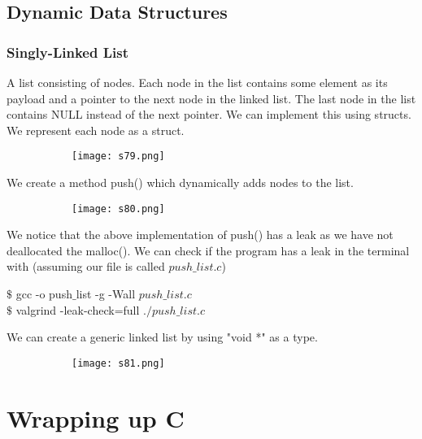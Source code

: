 \documentclass[8pt]{extreport}
\begin{document}
\section{Dynamic Data Structures}

\subsection{Singly-Linked List}

A list consisting of nodes. Each node in the list contains some element as its payload and a pointer to the next node in the linked list. The last node in the list contains NULL instead of the next pointer. We can implement this using structs. We represent each node as a struct.
\begin{figure}[H]
\centering
\begin{subfigure}[b]{0.4\linewidth}
\texttt{[image: s79.png]}
\end{subfigure}
\end{figure}
We create a method push() which dynamically adds nodes to the list.
\begin{figure}[H]
\centering
\begin{subfigure}[b]{0.4\linewidth}
\texttt{[image: s80.png]}
\end{subfigure}
\end{figure}
We notice that the above implementation of push() has a leak as we have not deallocated the malloc(). We can check if the program has a leak in the terminal with (assuming our file is called $push\_list.c$)
\begin{center}
$\$$ gcc -o push$\_$list -g -Wall $push\_list.c$\\
$\$$ valgrind -leak-check=full $./push\_list.c$\\

\end{center}
We can create a generic linked list by using "void *" as a type.
\begin{figure}[H]
\centering
\begin{subfigure}[b]{0.4\linewidth}
\texttt{[image: s81.png]}
\end{subfigure}
\end{figure}

\chapter{ Wrapping up C }
\end{document}
